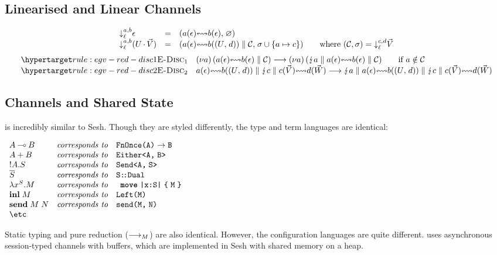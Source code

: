 \documentclass[acmsmall,review,anonymous]{acmart}
\begin{document}
\subsection{Linearised and Linear Channels}
\[
  \begin{array}{lcl}
    \mte[a,b]{\gvVecEmp}
    & = & \gvPair
          {\gvBuf{a}{\gvVecEmp}{b}{\gvVecEmp}}
          {\varnothing}
    \\
    \mte[a,b]{\parens{\tm{U}\gvVecAdd\gvVec{V}}}
    & = & \gvPair
          {\gvPar{\gvBuf{a}{\gvVecEmp}{b}{\gvPair{U}{d}}}{\gvConf{C}}}
          {\sigma\cup\{\tm{a}\mapsto\tm{c}\}}
          \qquad
          \text{where }(\gvConf{C},\sigma)=\mte[c,d]{\gvVec{V}}
  \end{array}
\]
\[
  \begin{array}{ll}
    \rlabel{\textsc{E-Disc$_1$}}{rule:egv-red-disc1}
    &
      \gvRes{a}{\gvPPar{\gvBuf{a}{\gvVecEmp}{b}{\gvVecEmp}}{\gvConf{C}}}
      \gvRedArr
      \gvRes{a}{\gvPPar{\gvZap{a}}{\gvPar{\gvBuf{a}{\gvVecEmp}{b}{\gvVecEmp}}{\gvConf{C}}}}
      \qquad
      \text{if }\tm{a}\notin\gvConf{C}
    \\
    \rlabel{\textsc{E-Disc$_2$}}{rule:egv-red-disc2}
    &
      \gvPar
      {\gvBuf{a}{\gvVecEmp}{b}{\gvPair{U}{d}}}
      {\gvPar{\gvZap{c}}{\gvBuf{c}{\gvVec{V}}{d}{\gvVec{W}}}}
      \gvRedArr
      \gvPar
      {\gvPar{\gvZap{a}}{\gvBuf{a}{\gvVecEmp}{b}{\gvPair{U}{d}}}}
      {\gvPar{\gvZap{c}}{\gvBuf{c}{\gvVec{V}}{d}{\gvVec{W}}}}
  \end{array}
\]

\subsection{Channels and Shared State}
\affineAGV is incredibly similar to Sesh. Though they are styled differently, the type and term languages are identical:
\begin{center}
  \(
  \begin{array}{lcl}
    \gvTyFun{A}{B}  & \textit{corresponds to} & \rvTyFun{A}{B}
    \\
    \gvTySum{A}{B}  & \textit{corresponds to} & \rvTySum{A}{B}
    \\
    \gvTySend{A}{S} & \textit{corresponds to} & \rvTySend{A}{S}
    \\
    \gvDual{S}      & \textit{corresponds to} & \rvDual{S}
    \\
    \gvAbs[S]{x}{M} & \textit{corresponds to} & \rvAbs[S]{x}{M}
    \\
    \gvInl{M}       & \textit{corresponds to} & \rvInl{M}
    \\
    \gvSend{M}{N}   & \textit{corresponds to} & \rvSend{M}{N}
    \\
    \text{\etc}
  \end{array}
  \)
\end{center}
Static typing and pure reduction ($\mathrel{\relax{\longrightarrow_{M}}}$) are also identical. However, the configuration languages are quite different. \affineAGV uses asynchronous session-typed channels with buffers, which are implemented in Sesh with shared memory on a heap.
\end{document}
